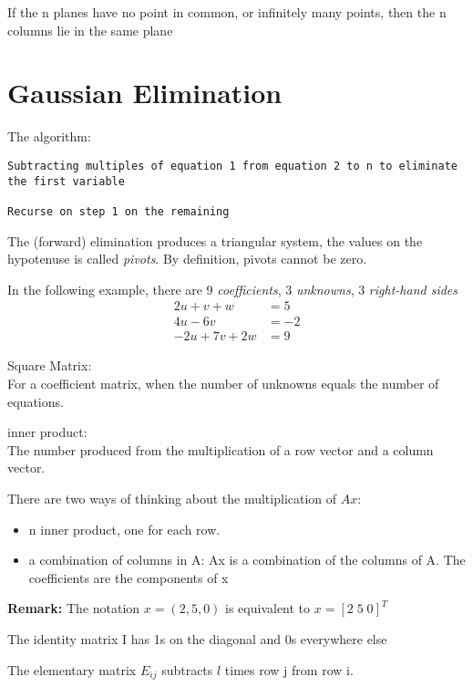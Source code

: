 \documentclass[12pt]{article}
\newcommand{\rmk}[1]{\par {\bf Remark: }{#1}}
\begin{document}
If the n planes have no point in common, or infinitely many points,
then the n columns lie in the same plane

\section{Gaussian Elimination}
The algorithm:
\begin{verbatim}
Subtracting multiples of equation 1 from equation 2 to n to eliminate
the first variable

Recurse on step 1 on the remaining
\end{verbatim}
The (forward) elimination produces a triangular system, the values on
the hypotenuse is called \emph{pivots}. By definition, pivots cannot
be zero.
\begin{definition}
  In the following example, there are 9 \emph{coefficients}, 3
  \emph{unknowns}, 3 \emph{right-hand sides}
  \begin{align*}
    2u + v + w &= 5\\
    4u - 6v &= -2\\
    -2u + 7v + 2w &= 9
  \end{align*}
\end{definition}
\begin{definition}
  Square Matrix: \\For a coefficient matrix, when the number of
  unknowns equals the number of equations.
\end{definition}
\begin{definition}inner product:\\
  The number produced from the multiplication of a row vector and a
  column vector.
\end{definition}
There are two ways of thinking about the multiplication of $Ax$: 
\begin{itemize}
\item n inner product, one for each row.
\item a combination of columns in A: Ax is a combination of the
  columns of A. The coefficients are the components of x
\end{itemize}
\rmk The notation $x = (2, 5, 0)$ is equivalent to $x = [2 \;5 \;0]^T$
\begin{definition}
  The identity matrix I has 1s on the diagonal and 0s everywhere else
\end{definition}
\begin{definition}
  The elementary matrix $E_{ij}$ subtracts $l$ times row j from row i.
\end{definition}
\end{document}
